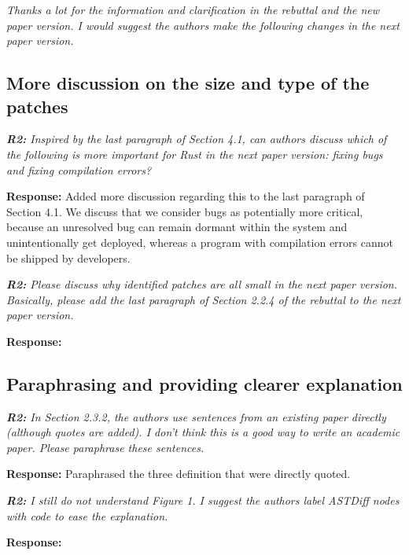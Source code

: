 \documentclass{article}
\begin{document}
\textit{Thanks a lot for the information and clarification in the rebuttal and the new paper version. I would suggest the authors make the following changes in the next paper version.}

\subsection{More discussion on the size and type of the patches}

\textit{\textbf{R2:} Inspired by the last paragraph of Section 4.1, can authors discuss which of the following is more important for Rust in the next paper version: fixing bugs and fixing compilation errors?}

\vspace*{1em} \noindent \textbf{Response:} Added more discussion regarding this to the last paragraph of Section 4.1. We discuss that we consider bugs as potentially more critical, because an unresolved bug can remain dormant within the system and unintentionally get deployed, whereas a program with compilation errors cannot be shipped by developers.

\vspace*{1em} \noindent \textit{\textbf{R2:} Please discuss why identified patches are all small in the next paper version. Basically, please add the last paragraph of Section 2.2.4 of the rebuttal to the next paper version.}

\vspace*{1em} \noindent \textbf{Response:} 

\subsection{Paraphrasing and providing clearer explanation}

\textit{\textbf{R2:} In Section 2.3.2, the authors use sentences from an existing paper directly (although quotes are added). I don't think this is a good way to write an academic paper. Please paraphrase these sentences.}

\vspace*{1em} \noindent \textbf{Response:} Paraphrased the three definition that were directly quoted.

\vspace*{1em} \noindent \textit{\textbf{R2: } I still do not understand Figure 1. I suggest the authors label ASTDiff nodes with code to ease the explanation.}

\vspace*{1em} \noindent \textbf{Response:} 
\end{document}

